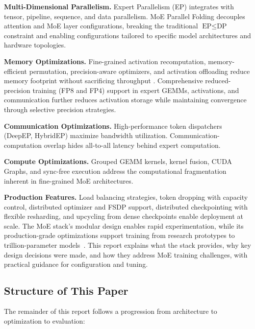 \documentclass[10pt,logo,copyright]{nvidiatechreport}
\begin{document}
\textbf{Multi-Dimensional Parallelism.} Expert Parallelism (EP) integrates with tensor, pipeline, sequence, and data parallelism. MoE Parallel Folding \cite{liu2025moeparallelfoldingheterogeneous} decouples attention and MoE layer configurations, breaking the traditional $\text{EP} \leq \text{DP}$ constraint and enabling configurations tailored to specific model architectures and hardware topologies.

\textbf{Memory Optimizations.} Fine-grained activation recomputation, memory-efficient permutation, precision-aware optimizers, and activation offloading reduce memory footprint without sacrificing throughput \cite{korthikanti2022reducingactivationrecomputationlarge,a2023learningwithdistributedoptimization}. Comprehensive reduced-precision training (FP8 and FP4) support in expert GEMMs, activations, and communication further reduces activation storage while maintaining convergence through selective precision strategies.

\textbf{Communication Optimizations.} High-performance token dispatchers (DeepEP, HybridEP) maximize bandwidth utilization. Communication-computation overlap hides all-to-all latency behind expert computation.

\textbf{Compute Optimizations.} Grouped GEMM kernels, kernel fusion, CUDA Graphs, and sync-free execution address the computational fragmentation inherent in fine-grained MoE architectures.

\textbf{Production Features.} Load balancing strategies, token dropping with capacity control, distributed optimizer and FSDP support, distributed checkpointing with flexible resharding, and upcycling from dense checkpoints enable deployment at scale.
The MoE stack's modular design enables rapid experimentation, while its production-grade optimizations support training from research prototypes to trillion-parameter models~\cite{nvidiamcoremoeuserguide}. This report explains what the stack provides, why key design decisions were made, and how they address MoE training challenges, with practical guidance for configuration and tuning.

\subsection{Structure of This Paper}

The remainder of this report follows a progression from architecture to optimization to evaluation:
\end{document}

